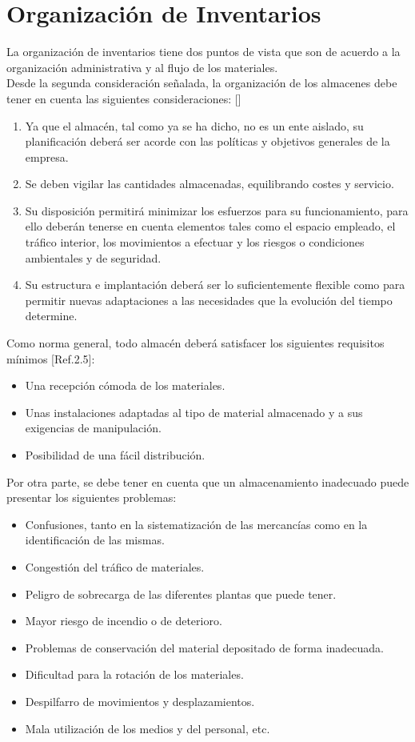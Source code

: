 \section{Organización de Inventarios}
La organización de inventarios tiene dos puntos de vista que son de acuerdo a la organización administrativa y al flujo de los materiales.\\

Desde la segunda consideración señalada, la organización de los almacenes debe tener en cuenta las siguientes consideraciones: [\citep{UDL:2019:Online}]\\
\begin{enumerate}
\item Ya que el almacén, tal como ya se ha dicho, no es un ente aislado, su planificación deberá ser acorde con las políticas y objetivos generales de la empresa.
\item Se deben vigilar las cantidades almacenadas, equilibrando costes y servicio.
\item Su disposición permitirá minimizar los esfuerzos para su funcionamiento, para ello deberán tenerse en cuenta elementos tales como el espacio empleado, el tráfico interior, los movimientos a efectuar y los riesgos o condiciones ambientales y de seguridad.
\item Su estructura e implantación deberá ser lo suficientemente flexible como para permitir nuevas adaptaciones a las necesidades que la evolución del tiempo determine.
\end{enumerate}

Como norma general, todo almacén deberá satisfacer los siguientes requisitos mínimos [Ref.2.5]:\\

\begin{itemize}
\item Una recepción cómoda de los materiales.
\item Unas instalaciones adaptadas al tipo de material almacenado y a sus exigencias de manipulación.
\item Posibilidad de una fácil distribución.
\end{itemize}

Por otra parte, se debe tener en cuenta que un almacenamiento inadecuado puede presentar los siguientes problemas:\\
\begin{itemize}
\item Confusiones, tanto en la sistematización de las mercancías como en la identificación de las mismas.
\item Congestión del tráfico de materiales.
\item Peligro de sobrecarga de las diferentes plantas que puede tener.
\item Mayor riesgo de incendio o de deterioro.
\item Problemas de conservación del material depositado de forma inadecuada.
\item Dificultad para la rotación de los materiales.
\item Despilfarro de movimientos y desplazamientos.
\item Mala utilización de los medios y del personal, etc.
\end{itemize}

